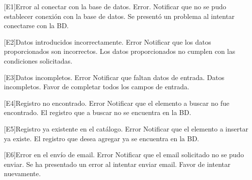 	\begin{Citemize}
		\item
		\begin{Message}{[E1]}{Error al conectar con la base de datos.}
			\MSGitem[Tipo: ] Error.
			\MSGitem[Objetivo: ] Notificar que no se pudo establecer conexión con la base de datos.
			\MSGitem[Redacción: ] Se presentó un problema al intentar conectarse con la BD.
		\end{Message}
	
		\item
		\begin{Message}{[E2]}{Datos introducidos incorrectamente.}
			\MSGitem[Tipo: ] Error
			\MSGitem[Objetivo: ] Notificar que los datos proporcionados son incorrectos.
			\MSGitem[Redacción: ] Los datos proporcionados no cumplen con las condiciones solicitadas.
		\end{Message}
	
		\item 
		\begin{Message}{[E3]}{Datos incompletos.}
			\MSGitem[Tipo: ] Error
			\MSGitem[Objetivo: ] Notificar que faltan datos de entrada.
			\MSGitem[Redacción: ] Datos incompletos. Favor de completar todos los campos de entrada.
		\end{Message}
	
		\item 
		\begin{Message}{[E4]}{Registro no encontrado.}
			\MSGitem[Tipo: ] Error
			\MSGitem[Objetivo: ] Notificar que el elemento a buscar no fue encontrado.
			\MSGitem[Redacción: ] El registro que a buscar no se encuentra en la BD.
		\end{Message}
	
		\item
		\begin{Message}{[E5]}{Registro ya existente en el catálogo.}
			\MSGitem[Tipo: ] Error
			\MSGitem[Objetivo: ] Notificar que el elemento a insertar ya existe.
			\MSGitem[Redacción: ] El registro que desea agregar ya se encuentra en la BD.
		\end{Message}
	
		\item
		\begin{Message}{[E6]}{Error en el envío de email.}
			\MSGitem[Tipo: ] Error
			\MSGitem[Objetivo: ] Notificar que el email solicitado no se pudo enviar.
			\MSGitem[Redacción: ] Se ha presentado un error al intentar enviar email. Favor de intentar nuevamente.
		\end{Message}
		

\end{Citemize}
